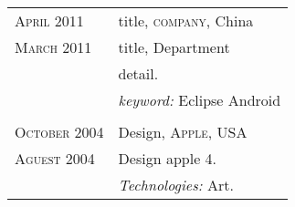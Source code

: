 %
%




\begin{longtable}{R{2.5cm}|p{14.8cm}}

  \textsc{April 2011}   & title, \textsc{company}, China   \\
  \textsc{March 2011}   & title, Department                \\&
  \footnotesize{detail.}                                   \\&
  \footnotesize{\emph{keyword:} Eclipse  Android  }        \\
                                       \\

  \textsc{October 2004} & Design, \textsc{Apple}, USA      \\
  \textsc{Aguest 2004}  & \footnotesize{ Design apple 4. } \\&
  \footnotesize{\emph{Technologies:} Art.}                 \\
\end{longtable}
